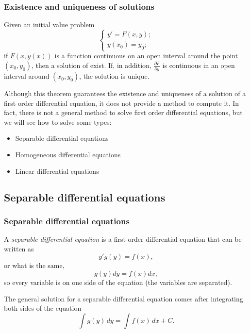 \begin{frame}
\frametitle{Existence and uniqueness of solutions}
\begin{theorem}
Given an initial value problem 
\[
\begin{cases}
y'=F(x,y);\\
y(x_0)=y_0;
\end{cases}
\]
if $F(x,y(x))$ is a function continuous on an open interval around the point $(x_0,y_0)$, then a solution of exist. 
If, in addition, $\frac{\partial F}{\partial y}$ is continuous in an open interval around $(x_0,y_0)$, the solution is unique. 
\end{theorem}

Although this theorem guarantees the existence and uniqueness of a solution of a first order differential equation, it does not provide a method to compute it. 
In fact, there is not a general method to solve first order differential equations, but we will see how to solve some types:
\begin{itemize}
\item Separable differential equations
\item Homogeneous differential equations
\item Linear differential equations
\end{itemize}
\end{frame}



\subsection{Separable differential equations}
\begin{frame}
\frametitle{Separable differential equations}
\begin{definition}
A \emph{separable differential equation} is a first order differential equation that can be written as
\[y'g(y)=f(x),\]
or what is the same,
\[g(y)dy=f(x)dx,\]
so every variable is on one side of the equation (the variables are separated).
\end{definition}

The general solution for a separable differential equation comes after integrating both sides of the equation
\[\int g(y)\,dy = \int f(x)\,dx+C.\]
\end{frame}


